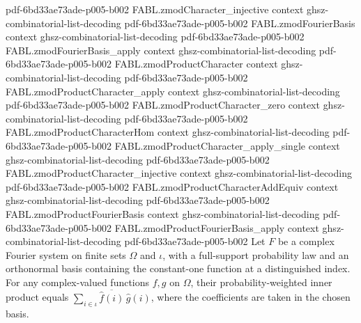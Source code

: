 \begin{theorem}
  {pdf-6bd33ae73ade-p005-b002}
\proofstep
  {FABL.zmodCharacter_injective}
  {context}
  {ghsz-combinatorial-list-decoding}
  {pdf-6bd33ae73ade-p005-b002}
\proofstep
  {FABL.zmodFourierBasis}
  {context}
  {ghsz-combinatorial-list-decoding}
  {pdf-6bd33ae73ade-p005-b002}
\proofstep
  {FABL.zmodFourierBasis_apply}
  {context}
  {ghsz-combinatorial-list-decoding}
  {pdf-6bd33ae73ade-p005-b002}
\proofstep
  {FABL.zmodProductCharacter}
  {context}
  {ghsz-combinatorial-list-decoding}
  {pdf-6bd33ae73ade-p005-b002}
\proofstep
  {FABL.zmodProductCharacter_apply}
  {context}
  {ghsz-combinatorial-list-decoding}
  {pdf-6bd33ae73ade-p005-b002}
\proofstep
  {FABL.zmodProductCharacter_zero}
  {context}
  {ghsz-combinatorial-list-decoding}
  {pdf-6bd33ae73ade-p005-b002}
\proofstep
  {FABL.zmodProductCharacterHom}
  {context}
  {ghsz-combinatorial-list-decoding}
  {pdf-6bd33ae73ade-p005-b002}
\proofstep
  {FABL.zmodProductCharacter_apply_single}
  {context}
  {ghsz-combinatorial-list-decoding}
  {pdf-6bd33ae73ade-p005-b002}
\proofstep
  {FABL.zmodProductCharacter_injective}
  {context}
  {ghsz-combinatorial-list-decoding}
  {pdf-6bd33ae73ade-p005-b002}
\proofstep
  {FABL.zmodProductCharacterAddEquiv}
  {context}
  {ghsz-combinatorial-list-decoding}
  {pdf-6bd33ae73ade-p005-b002}
\proofstep
  {FABL.zmodProductFourierBasis}
  {context}
  {ghsz-combinatorial-list-decoding}
  {pdf-6bd33ae73ade-p005-b002}
\proofstep
  {FABL.zmodProductFourierBasis_apply}
  {context}
  {ghsz-combinatorial-list-decoding}
  {pdf-6bd33ae73ade-p005-b002}
Let $F$ be a complex Fourier system on finite sets $Ω$ and $ι$, with a full-support
probability law and an orthonormal basis containing the constant-one function at a
distinguished index. For any complex-valued functions $f,g$ on $Ω$, their
probability-weighted inner product equals $\sum_{i\in ι}\overline{\widehat
f(i)}\,\widehat g(i)$, where the coefficients are taken in the chosen basis.
\end{theorem}

